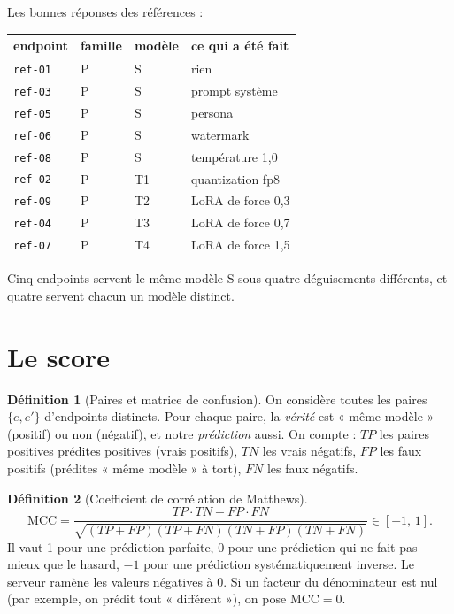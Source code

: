 \documentclass[11pt,a4paper]{report}
\theoremstyle{definition}
\newtheorem{definition}{Définition}[chapter]
\theoremstyle{plain}
\newcommand{\code}[1]{\texttt{#1}}
\begin{document}
\begin{exemple}
Les bonnes réponses des références :
\begin{center}\small
\begin{tabular}{llll}
\toprule
endpoint & famille & modèle & ce qui a été fait \\
\midrule
\code{ref-01} & P & S & rien \\
\code{ref-03} & P & S & prompt système \\
\code{ref-05} & P & S & persona \\
\code{ref-06} & P & S & watermark \\
\code{ref-08} & P & S & température 1,0 \\
\code{ref-02} & P & T1 & quantization fp8 \\
\code{ref-09} & P & T2 & LoRA de force 0,3 \\
\code{ref-04} & P & T3 & LoRA de force 0,7 \\
\code{ref-07} & P & T4 & LoRA de force 1,5 \\
\bottomrule
\end{tabular}
\end{center}
Cinq endpoints servent le même modèle S sous quatre déguisements différents, et quatre servent chacun un modèle distinct.
\end{exemple}

\section{Le score}

\begin{definition}[Paires et matrice de confusion]
On considère toutes les paires $\{e,e'\}$ d'endpoints distincts. Pour chaque paire, la \emph{vérité} est « même modèle » (positif) ou non (négatif), et notre \emph{prédiction} aussi. On compte : $TP$ les paires positives prédites positives (vrais positifs), $TN$ les vrais négatifs, $FP$ les faux positifs (prédites « même modèle » à tort), $FN$ les faux négatifs.
\end{definition}

\begin{definition}[Coefficient de corrélation de Matthews]
\[
\mathrm{MCC} = \frac{TP\cdot TN - FP\cdot FN}{\sqrt{(TP+FP)(TP+FN)(TN+FP)(TN+FN)}} \in [-1,\,1].
\]
Il vaut 1 pour une prédiction parfaite, 0 pour une prédiction qui ne fait pas mieux que le hasard, $-1$ pour une prédiction systématiquement inverse. Le serveur ramène les valeurs négatives à 0. Si un facteur du dénominateur est nul (par exemple, on prédit tout « différent »), on pose $\mathrm{MCC}=0$.
\end{definition}
\end{document}
